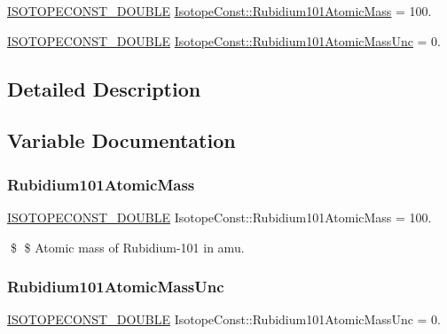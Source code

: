 \begin{DoxyCompactItemize}
\item 
\mbox{\hyperlink{group___isotope_const-_macros_ga8f45a7272ce02c0b4c65c44636ed719a}{I\+S\+O\+T\+O\+P\+E\+C\+O\+N\+S\+T\+\_\+\+D\+O\+U\+B\+LE}} \mbox{\hyperlink{group___isotope_const-_rubidium-_rb101_ga18ebb768c1304387b6e68c07fdc844a7}{Isotope\+Const\+::\+Rubidium101\+Atomic\+Mass}} = 100.
\item 
\mbox{\hyperlink{group___isotope_const-_macros_ga8f45a7272ce02c0b4c65c44636ed719a}{I\+S\+O\+T\+O\+P\+E\+C\+O\+N\+S\+T\+\_\+\+D\+O\+U\+B\+LE}} \mbox{\hyperlink{group___isotope_const-_rubidium-_rb101_ga5ddfa250bf949f43c98502ec195aa3e5}{Isotope\+Const\+::\+Rubidium101\+Atomic\+Mass\+Unc}} = 0.
\end{DoxyCompactItemize}


\subsection{Detailed Description}


\subsection{Variable Documentation}
\mbox{\label{group___isotope_const-_rubidium-_rb101_ga18ebb768c1304387b6e68c07fdc844a7}} 
\subsubsection{\texorpdfstring{Rubidium101\+Atomic\+Mass}{Rubidium101AtomicMass}}
{\footnotesize\ttfamily \mbox{\hyperlink{group___isotope_const-_macros_ga8f45a7272ce02c0b4c65c44636ed719a}{I\+S\+O\+T\+O\+P\+E\+C\+O\+N\+S\+T\+\_\+\+D\+O\+U\+B\+LE}} Isotope\+Const\+::\+Rubidium101\+Atomic\+Mass = 100.}

\$ \$ Atomic mass of Rubidium-\/101 in amu. \mbox{\label{group___isotope_const-_rubidium-_rb101_ga5ddfa250bf949f43c98502ec195aa3e5}} 
\subsubsection{\texorpdfstring{Rubidium101\+Atomic\+Mass\+Unc}{Rubidium101AtomicMassUnc}}
{\footnotesize\ttfamily \mbox{\hyperlink{group___isotope_const-_macros_ga8f45a7272ce02c0b4c65c44636ed719a}{I\+S\+O\+T\+O\+P\+E\+C\+O\+N\+S\+T\+\_\+\+D\+O\+U\+B\+LE}} Isotope\+Const\+::\+Rubidium101\+Atomic\+Mass\+Unc = 0.}


